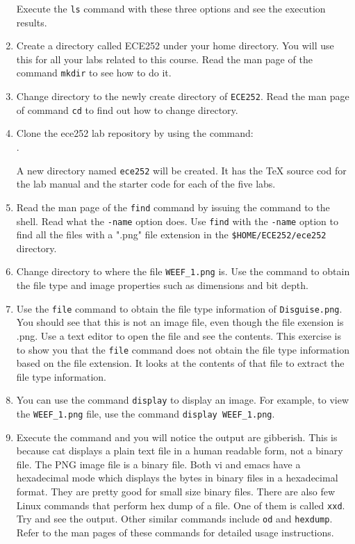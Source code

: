 \begin{enumerate}
      Execute  the \verb+ls+ command with these three options and see the execution results.
    \item Create a directory called ECE252 under your home directory. You will use this for all your labs related to this course.
          Read the man page of the command \verb+mkdir+ to see how to do it.
    \item Change directory to the newly create directory of \verb+ECE252+.
          Read the man page of command \verb+cd+ to find out how to change directory.
    \item Clone the ece252 lab repository by using the command: \\
      .

      A new directory named \verb+ece252+ will be created. It has the TeX source cod for the lab manual and the starter code for each of the five labs. 
    \item Read the man page of the \verb+find+ command by issuing the
       command to the shell. Read what the \verb+-name+ option does. Use \verb+find+ with the \verb+-name+ option to find all the files with a ".png" file extension in the \verb+$HOME/ECE252/ece252+ directory.
    \item Change directory to where the file \verb+WEEF_1.png+ is. Use the  command to obtain the file type and image properties such as dimensions and bit depth.
    \item Use the \verb+file+ command to obtain the file type information of \verb+Disguise.png+. You should see that this is not an image file, even though the file exension is .png.  Use a text editor to open the file and see the contents. This exercise is to show you that the \verb+file+ command does not obtain the file type information based on the file extension. It looks at the contents of that file to extract the file type information.
    \item You can use the command \verb+display+ to display an image. For example, to view the \verb+WEEF_1.png+ file, use the command \verb+display WEEF_1.png+. 
    \item Execute the  command and you will notice the output are gibberish. This is because cat displays a plain text file in a human readable form, not a binary file. The PNG image file is a binary file. Both vi and emacs have a hexadecimal mode which displays the bytes in binary files in a hexadecimal format. They are pretty good for small size binary files. There are also few Linux commands that perform hex dump of a file. One of them is called \verb+xxd+. Try  and see the output. Other similar commands include \verb+od+ and \verb+hexdump+. Refer to the man pages of these commands for detailed usage instructions. 

\end{enumerate}
